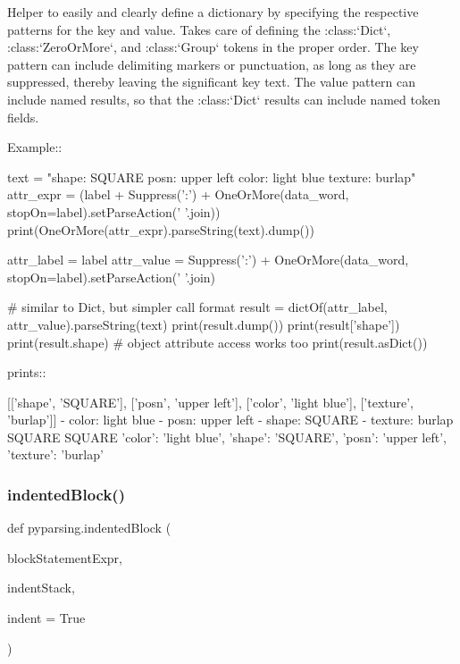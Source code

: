 \begin{DoxyVerb}Helper to easily and clearly define a dictionary by specifying
the respective patterns for the key and value.  Takes care of
defining the :class:`Dict`, :class:`ZeroOrMore`, and
:class:`Group` tokens in the proper order.  The key pattern
can include delimiting markers or punctuation, as long as they are
suppressed, thereby leaving the significant key text.  The value
pattern can include named results, so that the :class:`Dict` results
can include named token fields.

Example::

    text = "shape: SQUARE posn: upper left color: light blue texture: burlap"
    attr_expr = (label + Suppress(':') + OneOrMore(data_word, stopOn=label).setParseAction(' '.join))
    print(OneOrMore(attr_expr).parseString(text).dump())

    attr_label = label
    attr_value = Suppress(':') + OneOrMore(data_word, stopOn=label).setParseAction(' '.join)

    # similar to Dict, but simpler call format
    result = dictOf(attr_label, attr_value).parseString(text)
    print(result.dump())
    print(result['shape'])
    print(result.shape)  # object attribute access works too
    print(result.asDict())

prints::

    [['shape', 'SQUARE'], ['posn', 'upper left'], ['color', 'light blue'], ['texture', 'burlap']]
    - color: light blue
    - posn: upper left
    - shape: SQUARE
    - texture: burlap
    SQUARE
    SQUARE
    {'color': 'light blue', 'shape': 'SQUARE', 'posn': 'upper left', 'texture': 'burlap'}
\end{DoxyVerb}
 \mbox{\label{namespacepyparsing_ab8b1b70b5d1e96e7c4ac6c23d76f8a3a}} 
\subsubsection{\texorpdfstring{indented\+Block()}{indentedBlock()}}
{\footnotesize\ttfamily def pyparsing.\+indented\+Block (\begin{DoxyParamCaption}\item[{}]{block\+Statement\+Expr,  }\item[{}]{indent\+Stack,  }\item[{}]{indent = {\ttfamily True} }\end{DoxyParamCaption})}

